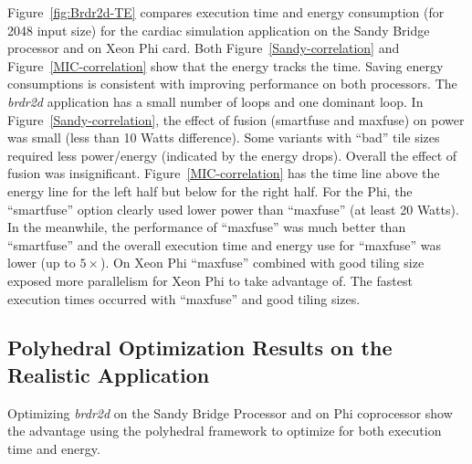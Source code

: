 Figure~\ref{fig:Brdr2d-TE} compares execution time and energy consumption  (for 2048 input size) for
the cardiac simulation application on the Sandy Bridge processor and on Xeon Phi card.
Both Figure~\ref{Sandy-correlation} and Figure~\ref{MIC-correlation} show that the
energy tracks the time. Saving energy consumptions is consistent with 
improving performance on both processors.
The \emph{brdr2d} application has a small number of loops and one
dominant loop. In Figure~\ref{Sandy-correlation}, the effect of fusion (smartfuse
and maxfuse) on power was small (less than 10 Watts difference).
Some variants with ``bad'' tile sizes required less power/energy (indicated by the energy drops).
Overall the effect of fusion was insignificant.
Figure~\ref{MIC-correlation} has the time line above
the energy line for the left half but below for the right half. 
For the Phi, the ``smartfuse'' option clearly used lower power than ``maxfuse'' (at least
20 Watts). In the meanwhile, the performance of ``maxfuse'' was much better than ``smartfuse''
and the overall execution time and energy use for ``maxfuse'' was lower (up to $5\times$).
On Xeon Phi ``maxfuse'' combined with good tiling size exposed
more parallelism for Xeon Phi to take advantage of.  The fastest execution times occurred
with ``maxfuse'' and good tiling sizes.
\subsection{Polyhedral Optimization Results on the Realistic Application}
Optimizing \emph{brdr2d} on the Sandy Bridge Processor and on Phi coprocessor show the
advantage using the polyhedral framework to optimize for
both execution time and energy.

